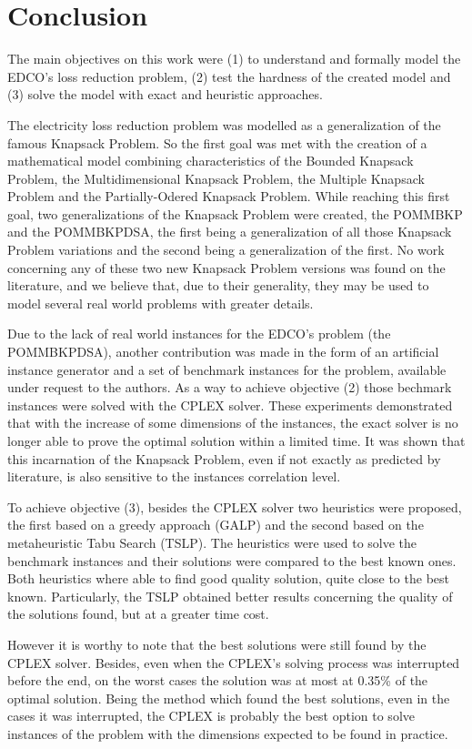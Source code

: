 \section{Conclusion}
\label{sec:conclu}
The main objectives on this work were (1) to understand and formally model the EDCO's loss reduction problem, (2) test the hardness
of the created model and (3) solve the model with exact and heuristic approaches.

The electricity loss reduction problem was modelled as a generalization of the famous Knapsack Problem. So the first goal was met
with the creation of a mathematical model combining characteristics of the Bounded Knapsack Problem, the Multidimensional Knapsack
Problem, the Multiple Knapsack Problem and the Partially-Odered Knapsack Problem. While reaching this first goal, two 
generalizations of the Knapsack Problem were created, the POMMBKP and the POMMBKPDSA, the first being a generalization of
all those Knapsack Problem variations and the second being a generalization of the first. No work concerning any of these two new 
Knapsack Problem versions was found on the literature, and we believe that, due to their generality, they may be used to model 
several real world problems with greater details.

Due to the lack of real world instances for the EDCO's problem (the POMMBKPDSA), another contribution was made in the form of an 
artificial instance generator and a set of benchmark instances for the problem, available under request to the authors. As a way to achieve objective (2)
those bechmark instances were solved with the CPLEX solver. These experiments demonstrated that with the increase of some dimensions
of the instances, the exact solver is no longer able to prove the optimal solution within a limited time. It was shown that this 
incarnation of the Knapsack Problem, even if not exactly as predicted by literature, is also sensitive to the instances correlation level.

To achieve objective (3), besides the CPLEX solver two heuristics were proposed, the first based on a greedy approach (GALP) and the second based 
on the metaheuristic Tabu Search (TSLP). The heuristics were used to solve the benchmark instances and their solutions were compared to the best
known ones. Both heuristics where able to find good quality solution, quite close to the best known. Particularly, the TSLP obtained better results
concerning the quality of the solutions found, but at a greater time cost.

However it is worthy to note that the best solutions were still found by the CPLEX solver. Besides, even when the CPLEX's solving 
process was interrupted before the end, on the worst cases the solution was at most at 0.35\% of the optimal solution. Being the method which
found the best solutions, even in the cases it was interrupted, the CPLEX is probably the best option 
to solve instances of the problem with the dimensions expected to be found in practice.
